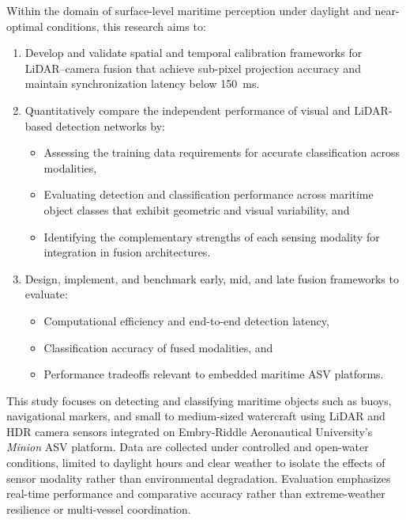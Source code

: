 \documentclass{erauthesis}
\begin{document}
Within the domain of surface-level maritime perception under daylight and near-optimal conditions, this research aims to:
\begin{enumerate}
    \item Develop and validate spatial and temporal calibration frameworks for LiDAR–camera fusion that achieve sub-pixel projection accuracy and maintain synchronization latency below 150~ms.
    \item Quantitatively compare the independent performance of visual and LiDAR-based detection networks by:
    \begin{itemize}
        \item Assessing the training data requirements for accurate classification across modalities,
        \item Evaluating detection and classification performance across maritime object classes that exhibit geometric and visual variability, and
        \item Identifying the complementary strengths of each sensing modality for integration in fusion architectures.
    \end{itemize}
    \item Design, implement, and benchmark early, mid, and late fusion frameworks to evaluate:
    \begin{itemize}
        \item Computational efficiency and end-to-end detection latency,
        \item Classification accuracy of fused modalities, and
        \item Performance tradeoffs relevant to embedded maritime ASV platforms.
    \end{itemize}
\end{enumerate}

This study focuses on detecting and classifying maritime objects such as buoys, navigational markers, and small to medium-sized watercraft using LiDAR and HDR camera sensors integrated on Embry-Riddle Aeronautical University’s \textit{Minion} ASV platform. 
Data are collected under controlled and open-water conditions, limited to daylight hours and clear weather to isolate the effects of sensor modality rather than environmental degradation. Evaluation emphasizes real-time performance and comparative accuracy rather than extreme-weather resilience or multi-vessel coordination.
\end{document}
